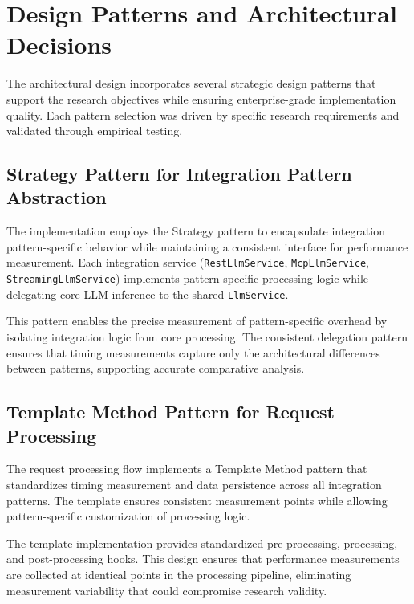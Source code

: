 \section{Design Patterns and Architectural Decisions}

The architectural design incorporates several strategic design patterns that support the research objectives while ensuring enterprise-grade implementation quality. Each pattern selection was driven by specific research requirements and validated through empirical testing.

\subsection{Strategy Pattern for Integration Pattern Abstraction}

The implementation employs the Strategy pattern to encapsulate integration pattern-specific behavior while maintaining a consistent interface for performance measurement. Each integration service (\texttt{RestLlmService}, \texttt{McpLlmService}, \texttt{StreamingLlmService}) implements pattern-specific processing logic while delegating core LLM inference to the shared \texttt{LlmService}.

This pattern enables the precise measurement of pattern-specific overhead by isolating integration logic from core processing. The consistent delegation pattern ensures that timing measurements capture only the architectural differences between patterns, supporting accurate comparative analysis.

\subsection{Template Method Pattern for Request Processing}

The request processing flow implements a Template Method pattern that standardizes timing measurement and data persistence across all integration patterns. The template ensures consistent measurement points while allowing pattern-specific customization of processing logic.

The template implementation provides standardized pre-processing, processing, and post-processing hooks. This design ensures that performance measurements are collected at identical points in the processing pipeline, eliminating measurement variability that could compromise research validity.

